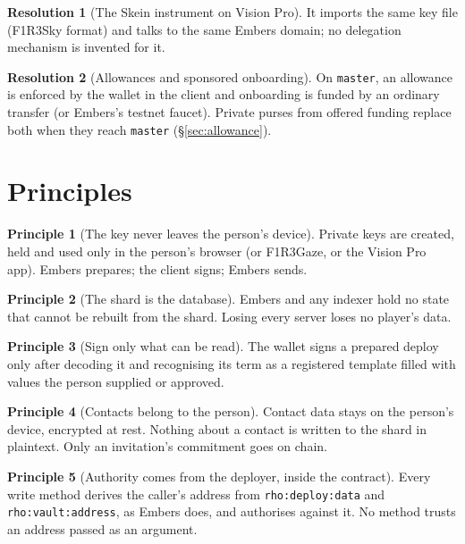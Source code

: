 \documentclass[11pt]{article}
\theoremstyle{definition}
\newtheorem{principle}{Principle}
\newtheorem{resolution}{Resolution}
\theoremstyle{remark}
\newcommand{\code}[1]{\texttt{#1}}
\newcommand{\Em}{Embers}
\newcommand{\Sky}{F1R3Sky}
\newcommand{\Gz}{F1R3Gaze}
\begin{document}
\begin{resolution}[The Skein instrument on Vision Pro]
It imports the same key file (\Sky{} format) and talks to the same \Em{} domain; no
delegation mechanism is invented for it.
\end{resolution}

\begin{resolution}[Allowances and sponsored onboarding]
On \code{master}, an allowance is enforced by the wallet in the client and
onboarding is funded by an ordinary transfer (or \Em{}'s testnet faucet). Private
purses from offered funding replace both when they reach \code{master}
(\S\ref{sec:allowance}).
\end{resolution}

\section{Principles}\label{sec:principles}

\begin{principle}[The key never leaves the person's device]
Private keys are created, held and used only in the person's browser (or \Gz{}, or
the Vision Pro app). \Em{} prepares; the client signs; \Em{} sends.
\end{principle}

\begin{principle}[The shard is the database]
\Em{} and any indexer hold no state that cannot be rebuilt from the shard. Losing
every server loses no player's data.
\end{principle}

\begin{principle}[Sign only what can be read]
The wallet signs a prepared deploy only after decoding it and recognising its term as
a registered template filled with values the person supplied or approved.
\end{principle}

\begin{principle}[Contacts belong to the person]
Contact data stays on the person's device, encrypted at rest. Nothing about a contact
is written to the shard in plaintext. Only an invitation's commitment goes on chain.
\end{principle}

\begin{principle}[Authority comes from the deployer, inside the contract]
Every write method derives the caller's address from \code{rho:deploy:data} and
\code{rho:vault:address}, as \Em{} does, and authorises against it. No method trusts
an address passed as an argument.
\end{principle}
\end{document}
